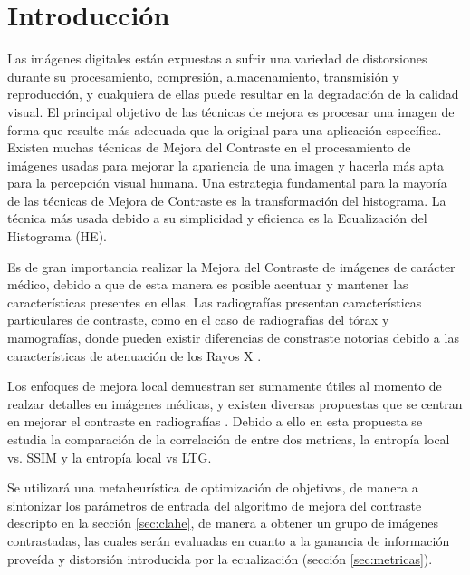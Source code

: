 \documentclass[spanish,twocolumn]{article}
\begin{document}
\section{Introducción}
\label{sec:intro}
Las imágenes digitales están expuestas a sufrir una variedad de distorsiones durante su procesamiento, compresión, almacenamiento, transmisión y reproducción, y cualquiera de ellas puede resultar en la degradación de la calidad visual.
El principal objetivo de las técnicas de mejora es procesar una imagen de forma que resulte más adecuada que la original para una aplicación específica. Existen muchas técnicas de Mejora del Contraste en el procesamiento de imágenes usadas para mejorar la apariencia de una imagen y hacerla más apta para la percepción visual humana. Una estrategia fundamental para la mayoría de las técnicas de Mejora de Contraste es la transformación del histograma. La técnica más usada debido a su simplicidad y eficienca es la Ecualización del Histograma (HE). %

Es de gran importancia realizar la Mejora del Contraste de imágenes de carácter médico, debido a que de esta manera es posible acentuar y mantener las características presentes en ellas. Las radiografías presentan características particulares de contraste, como en el caso de radiografías del tórax y mamografías, donde pueden existir diferencias de constraste notorias debido a las características de atenuación de los Rayos X \cite{chang1998image}.

Los enfoques de mejora local demuestran ser sumamente útiles al momento de realzar detalles en imágenes médicas, y existen diversas propuestas que se centran en mejorar el contraste en radiografías \cite{1625082,4712472,5360176}. Debido a ello en esta  propuesta se estudia la comparación de la correlación de entre dos metricas, la entropía local vs. SSIM y la entropía local vs LTG. %

 Se utilizará una metaheurística de optimización de objetivos, de manera a sintonizar los parámetros de entrada del algoritmo de mejora del contraste descripto en la sección \ref{sec:clahe}, de manera a obtener un grupo de imágenes contrastadas, las cuales serán evaluadas en cuanto a la ganancia de información proveída y distorsión introducida por la ecualización (sección \ref{sec:metricas}).
\end{document}
